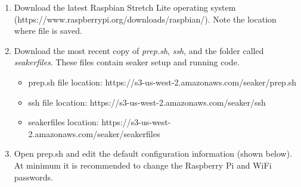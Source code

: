 \documentclass[12pt]{article}
\begin{document}
\begin{enumerate}
  \item Download the latest Raspbian Stretch Lite operating system\\
  (https://www.raspberrypi.org/downloads/raspbian/).
  Note the location where file is saved.
  \item Download the most recent copy of {\em prep.sh}, {\em ssh}, and the 
  folder called {\em seakerfiles}. These files
  contain \gls{seaker} setup and running code.
    \begin{itemize}
      \item prep.sh file location: https://s3-us-west-2.amazonaws.com/seaker/prep.sh
      \item ssh file location: https://s3-us-west-2.amazonaws.com/seaker/ssh
      \item seakerfiles location: https://s3-us-west-2.amazonaws.com/seaker/seakerfiles
    \end{itemize}
  \item Open prep.sh and edit the default configuration information
  (shown below). At minimum it is recommended to change the Raspberry
  Pi and WiFi passwords.\\

  


\end{enumerate}
\end{document}
